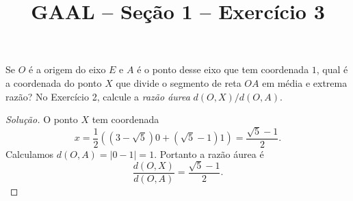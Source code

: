 \documentclass[a4paper,11pt]{article}
\title{GAAL -- Seção 1 -- Exercício 3}
\author{\empty}
\date{\empty}
\newcommand\onlyinsubfileone\maketitle
\begin{document}
\onlyinsubfileone

\begin{exercicio-gaal}[E3.S1]
  Se $O$ é a origem do eixo $E$ e $A$ é o ponto desse eixo que tem coordenada $1$, qual é a coordenada do ponto $X$ que divide o segmento de reta $OA$ em média e extrema razão?
  No Exercício 2, calcule a \emph{razão áurea} $d(O,X)/d(O,A)$.
\end{exercicio-gaal}

\begin{proof}[Solução]
  O ponto $X$ tem coordenada
  \[
    x = \frac{1}{2} ( (3-\sqrt{5}) 0 + (\sqrt{5}-1) 1 ) = \frac{\sqrt{5}-1}{2}.
  \]
  Calculamos $d(O,A) = |0-1| = 1$.
  Portanto a razão áurea é
  \[
    \frac{d(O,X)}{d(O,A)} = \frac{\sqrt{5}-1}{2}.
  \]
\end{proof}
\end{document}
